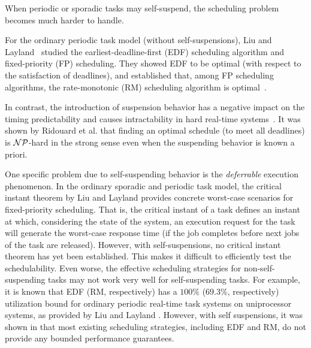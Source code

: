 
When  periodic or sporadic tasks may self-suspend, the scheduling problem becomes much harder to handle. 

For the ordinary periodic task model (without self-suspensions), Liu and Layland~ \cite{Liu_1973} studied the earliest-deadline-first (EDF) scheduling algorithm and fixed-priority (FP) scheduling. They showed EDF to be optimal (with respect to the satisfaction of deadlines), and established that, among FP scheduling algorithms, the rate-monotonic (RM) scheduling algorithm is optimal~\cite{Liu_1973}. %

In contrast, the introduction of suspension behavior has a negative impact on the timing predictability and causes intractability in hard real-time systems~\cite{Ridouard_2004}. It was shown by Ridouard et al. \cite{Ridouard_2004} that finding an optimal schedule (to meet all deadlines) is ${\cal NP}$-hard in the strong sense even when the suspending behavior is known a priori.


One specific problem due to self-suspending behavior is the \emph{deferrable} execution phenomenon. In the ordinary sporadic and periodic task model, the critical instant theorem by Liu and Layland \cite{Liu_1973} provides concrete worst-case scenarios for fixed-priority scheduling.  That is, the critical instant of a task defines an instant at which, considering the state of the system, an execution request for the task will generate the worst-case response time (if the job completes before next jobs of the task are released).
However, with self-suspensions, no critical instant theorem has yet been established. This makes it difficult to efficiently test the schedulability. Even worse, the effective scheduling strategies for non-self-suspending tasks may not work very well for self-suspending tasks.
For example, it is known that EDF (RM, respectively) has a $100\%$ ($69.3\%$, respectively) utilization bound for ordinary periodic real-time task systems on uniprocessor systems, as provided by Liu and Layland \cite{Liu_1973}. However, with self suspensions,  it was shown in \cite{Ridouard_2004,RTSS-ChenL14} that most existing scheduling strategies, including EDF and RM, do not  provide any bounded performance guarantees. 

